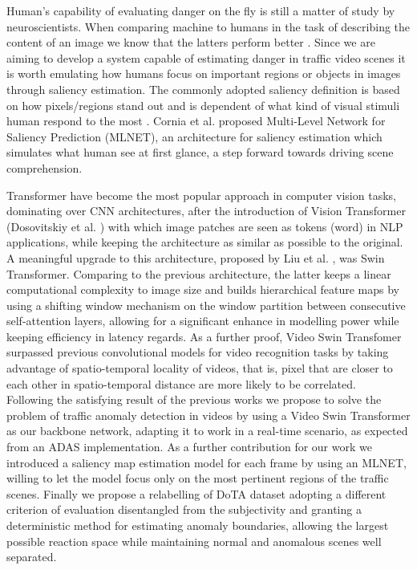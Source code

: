 Human's capability of evaluating danger on the fly is still a matter of study by neuroscientists.
When comparing machine to humans in the task of describing the content of an image we know that the latters perform better \cite{jiang2015salicon}.
Since we are aiming to develop a system capable of estimating danger in traffic video scenes it is worth emulating how humans focus on important regions or objects in images through saliency estimation.
The commonly adopted saliency definition is based on how pixels/regions stand out and is dependent of what kind of visual stimuli human respond to the most \cite{yan2013hierachical}.
Cornia et al.\cite{cornia2016saliency} proposed Multi-Level Network for Saliency Prediction (MLNET), an architecture for saliency estimation which simulates what human see at first glance, a step forward towards driving scene comprehension.

Transformer have become the most popular approach in computer vision tasks, dominating over CNN architectures, after the introduction of Vision Transformer (Dosovitskiy et al. \cite{dosovitskiy2020vit})  with which image patches are seen as tokens (word) in NLP applications, while keeping the architecture as similar as possible to the original.
A meaningful upgrade to this architecture, proposed by Liu et al. \cite{liu2021Swin}, was Swin Transformer.
Comparing to the previous architecture, the latter keeps a linear computational complexity to image size and builds hierarchical feature maps by using a shifting window mechanism on the window partition between consecutive self-attention layers, allowing for a significant enhance in modelling power while keeping efficiency in latency regards.
As a further proof, Video Swin Transfomer \cite{liu_video_2022} surpassed previous convolutional models for video recognition tasks by taking advantage of spatio-temporal locality of videos, that is, pixel that are closer to each other in spatio-temporal distance are more likely to be correlated.\\

Following the satisfying result of the previous works we propose to solve the problem of traffic anomaly detection in videos by using a Video Swin Transformer as our backbone network, adapting it to work in a real-time scenario, as expected from an ADAS implementation.
As a further contribution for our work we introduced a saliency map estimation model for each frame by using an MLNET, willing to let the model focus only on the most pertinent regions of the traffic scenes.
Finally we propose a relabelling of DoTA dataset adopting a different criterion of evaluation disentangled from the subjectivity and granting a deterministic method for estimating anomaly boundaries, allowing the largest possible reaction space while maintaining normal and anomalous scenes well separated.